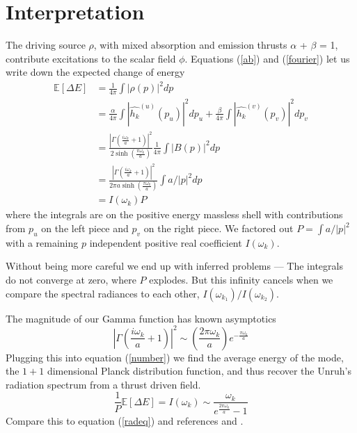 \documentclass[12pt,a4paper]{article}
\begin{document}
\section{Interpretation}
The driving source $\rho$, with mixed absorption and emission thrusts $\alpha$ + $\beta$ = 1, contribute excitations to the scalar field $\phi$. Equations (\ref{ab}) and (\ref{fourier}) let us write down the expected change of energy
\begin{equation}  
  \label{number}
  \begin{split}
    \mathbb{E}[\Delta E] &= \frac{1}{4\pi} \int{|\rho(p)|^2 dp} \\
    &= \frac{\alpha}{4\pi} \int{\left|\hat{h_k}^{(u)}(p_u)\right|^2 dp_u} + \frac{\beta}{4\pi}\int{\left|\hat{h_k}^{(v)}(p_v)\right|^2dp_v} \\
    &= \frac{\left|\Gamma\left(\frac{i\omega_k}{a} + 1\right)\right|^2}{2 \sinh \left({\frac{\pi\omega_k}{a}}\right)} \frac{1}{4\pi} \int{{\left|B(p)\right|^2} dp} \\
    &=  \frac{\left|\Gamma\left(\frac{i\omega_k}{a} + 1\right)\right|^2}{2 \pi a \sinh \left({\frac{\pi\omega_k}{a}}\right)} \int{a/|p|^2 dp}\\  
&=I(\omega_k) P
  \end{split}
\end{equation}
where the integrals are on the positive energy massless shell with contributions from $p_u$ on the left piece and $p_v$ on the right piece.  We factored out $P = \int{a/|p|^2}$ with a remaining $p$ independent positive real coefficient $I(\omega_k)$.

Without being more careful we end up with inferred problems --- The integrals do not converge at zero, where $P$ explodes.  But this infinity cancels when we compare the spectral radiances to each other, $I(\omega_{k_1}) / I(\omega_{k_2})$.

The magnitude of our Gamma function has known asymptotics \cite[Eq.~5.11.9]{NIST:DLMF}
\begin{equation}
\left|\Gamma\left(\frac{i\omega_k}{a} + 1\right) \right|^2 \sim \left(\frac{2 \pi \omega_k} {a}\right) e^{-\frac{\pi\omega_k}{a}}
\end{equation}
Plugging this into equation (\ref{number}) we find the average energy of the mode, the $1+1$ dimensional Planck distribution function, and thus recover the Unruh's radiation spectrum from a thrust driven field.
\begin{equation}
\frac{1}{P} \mathbb{E}[\Delta E] = I(\omega_k) \sim \frac{\omega_k}{e^{\frac{2 \pi \omega_k}{a}}-1}
\end{equation}
Compare this to equation (\ref{radeq}) and references \cite{unruh} and \cite{Frodden}.
\end{document}
